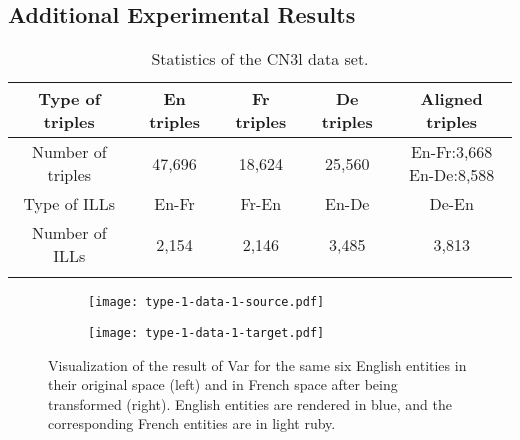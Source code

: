 \documentclass{article}
\begin{document}
\subsection{Additional Experimental Results}


\begin{table}[t!]
\centering
\caption{Statistics of the CN3l data set.}
\label{tbl:CN3l}
\vspace{-1em}
\scriptsize
\begin{tabular}{c|cccc}
\bhline
Type of triples&En triples&Fr triples&De triples&Aligned triples\\
\hline
Number of triples&47,696&18,624&25,560&\makecell{En-Fr:3,668\\En-De:8,588}\\
\bhline
Type of ILLs&En-Fr&Fr-En&En-De&De-En\\
\hline
Number of ILLs&2,154&2,146&3,485&3,813\\
\bhline
\end{tabular}
\vspace{-1em}
\end{table}



\begin{figure*}[t]
\vspace{-1.5em}
\centering
\begin{subfigure}[c]{0.4\textwidth}
\centering
\texttt{[image: type-1-data-1-source.pdf]}
\end{subfigure}
\hspace{5em}
\begin{subfigure}[c]{0.4\textwidth}
\centering
\texttt{[image: type-1-data-1-target.pdf]}
\end{subfigure}
\vspace{-2em}
\caption{Visualization of
the result of Var for
the same six English entities in their original space (left) and in French space after being transformed (right).
English entities are
rendered in blue, and
the corresponding French entities are
in light ruby.
}
\label{fig:viz}
\end{figure*}
\end{document}

